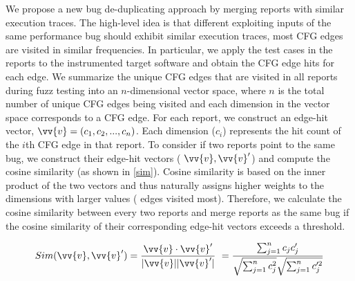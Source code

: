 We propose a new bug de-duplicating approach by merging reports with similar execution traces.
%
The high-level idea is that different exploiting inputs of the same performance bug should exhibit similar execution traces, \ie{,} most CFG edges are visited in similar frequencies.
%
In particular, we apply the test cases in the reports to the instrumented target software and obtain the CFG edge hits for each edge.
%
We summarize the unique CFG edges that are visited in all reports during fuzz testing into an $n$-dimensional vector space, where $n$ is the total number of unique CFG edges being visited and each dimension in the vector space corresponds to a CFG edge.
%
For each report, we construct an edge-hit vector, \eg{,} $\vv{v}=\left (c_1, c_2, ... , c_n \right )$.
%
Each dimension ($c_i$) represents the hit count of the $i$th CFG edge in that report.
%
%
To consider if two reports point to the same bug, we construct their edge-hit vectors (\eg{,} $\vv{v}, \vv{v}'$) and compute the cosine similarity (as shown in \autoref{sim}).
%
Cosine similarity is based on the inner product of the two vectors and thus naturally assigns higher weights to the dimensions with larger values (\ie{,} edges visited most).
%
%
Therefore, we calculate the cosine similarity between every two reports and merge reports as the same bug if the cosine similarity of their corresponding edge-hit vectors exceeds a threshold.
%

\begin{equation} \label{sim}
    Sim(\vv{v}, \vv{v}') = \frac{\vv{v}\cdot \vv{v}'}{|\vv{v}||\vv{v}'|}\
    = \frac{\sum_{j=1}^{n}{c_jc_j'}}{\sqrt{\sum_{j=1}^{n}{c_j^2}} \sqrt{\sum_{j=1}^{n}{c_j'^2}} }
\end{equation}

